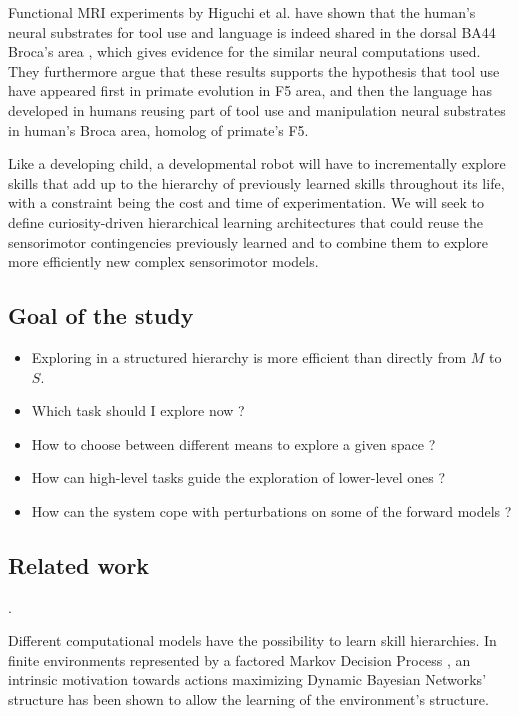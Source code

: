 \documentclass[conference]{include/IEEEtran}
\begin{document}
	Functional MRI experiments by Higuchi et al. have shown that the human's neural substrates for tool use and language is indeed shared in 
	the dorsal BA44 Broca's area \cite{higuchi}, which gives evidence for the similar neural computations used. 
	They furthermore argue that these results supports the hypothesis that tool use have appeared first in primate evolution in F5 area,
	and then the language has developed in humans reusing part of tool use and manipulation neural substrates in human's Broca area, homolog of primate's F5.

	Like a developing child, a developmental robot will have to incrementally explore skills that add up to the hierarchy of previously learned skills 
	throughout its life, with a constraint being the cost and time of experimentation. 
	We will seek to define curiosity-driven hierarchical learning architectures 
	that could reuse the sensorimotor contingencies previously learned and to combine them 
	to explore more efficiently new complex sensorimotor models. 
		
	\subsection{Goal of the study}
			
		\begin{itemize}
			\item Exploring in a structured hierarchy is more efficient than directly from $M$ to $S$.
			\item Which task should I explore now ?
			\item How to choose between different means to explore a given space ? 
			\item How can high-level tasks guide the exploration of lower-level ones ?
			\item How can the system cope with perturbations on some of the forward models ?		
		\end{itemize}

		
	
	\subsection{Related work}
		\cite{ugur2014, ugur2015}.

		Different computational models have the possibility to learn skill hierarchies. 
		In finite environments represented by a factored Markov Decision Process \cite{vig}, an intrinsic motivation towards actions 
		maximizing Dynamic Bayesian Networks' structure has been shown to allow the learning of the environment's structure.
		
\end{document}
